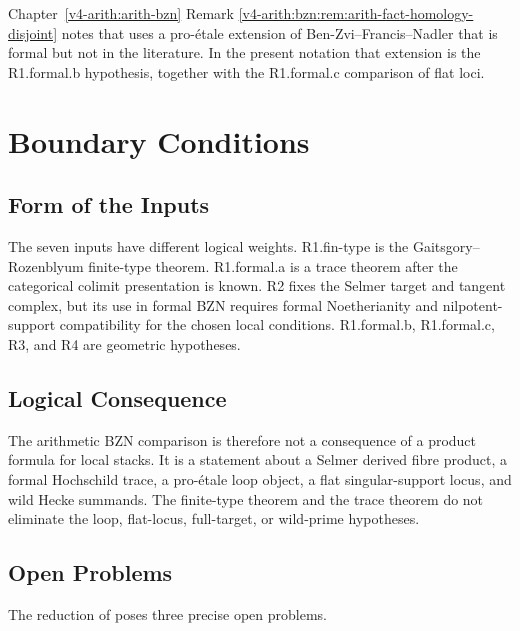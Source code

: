 \begin{remark}
\label{v4-arith:bzn-sub:rem:wave1-consistency}
Chapter~\ref{v4-arith:arith-bzn} Remark
\ref{v4-arith:bzn:rem:arith-fact-homology-disjoint} notes that
 uses a pro-\'etale
extension of Ben-Zvi--Francis--Nadler that is formal but not in
the literature. In the present notation that extension is the
R1.formal.b hypothesis, together with the R1.formal.c comparison of
flat loci.
\end{remark}

\section{Boundary Conditions}
\label{v4-arith:bzn-sub:residuals}

\subsection{Form of the Inputs}

The seven inputs have different logical weights. R1.fin-type is the
Gaitsgory--Rozenblyum finite-type theorem. R1.formal.a is a trace
theorem after the categorical colimit presentation is known. R2 fixes
the Selmer target and tangent complex, but its use in formal BZN
requires formal Noetherianity and nilpotent-support compatibility for
the chosen local conditions. R1.formal.b, R1.formal.c, R3, and R4 are
geometric hypotheses.

\subsection{Logical Consequence}

The arithmetic BZN comparison is therefore not a consequence of a
product formula for local stacks. It is a statement about a Selmer
derived fibre product, a formal Hochschild trace, a pro-\'etale loop
object, a flat singular-support locus, and wild Hecke summands.  The
finite-type theorem and the trace theorem do not eliminate the loop,
flat-locus, full-target, or wild-prime hypotheses.

\subsection{Open Problems}

The reduction of 
poses three precise open problems.

